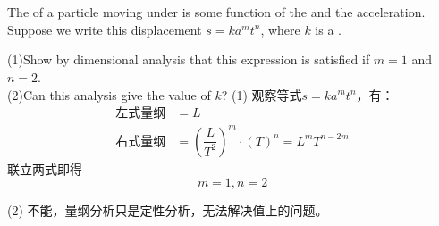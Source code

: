 \chapter[基础知识]{}
\begin{solution}[量纲分析]
    The  of a particle moving under  is some function of the  and
    the acceleration. Suppose we write this displacement
    $s=ka^mt^n$, where $k$ is a .

    \tcbrule

    (1)Show by
    dimensional analysis that this expression is satisfied if
    $m = 1$ and $n = 2$. \\
    (2)Can this analysis give the value of $k$?
    (1) 观察等式$s=ka^mt^n$，有：
    \begin{align*}
        \text{左式量纲} & =L                                        \\
        \text{右式量纲} & =(\dfrac{L}{T^2})^m\cdot(T)^n=L^mT^{n-2m}
    \end{align*}
    联立两式即得
    \[m=1,n=2\]
    \par
    (2) 不能，量纲分析只是定性分析，无法解决值上的问题。
\end{solution}

